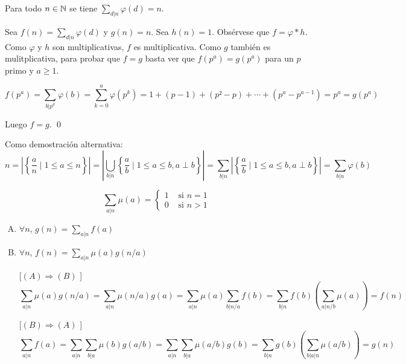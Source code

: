 \documentclass[TAN.tex]{subfiles}
\begin{document}
\begin{prop}
Para todo $n \in \mathbb{N}$ se tiene $\displaystyle\sum_{d|n} φ(d) = n$.
\end{prop}

\begin{dem}
Sea $f(n) = \sum_{d|n} φ(d)$ y $g(n) = n$. Sea $h(n) = 1$. Obsérvese que $f = φ * h$. Como $φ$ y $h$ son multiplicativas, $f$ es multiplicativa. Como $g$ también es mulitplicativa, para probar que $f = g$ basta ver que $f(p^a)=g(p^a)$ para un $p$ primo y $a ≥ 1$.

\[ f(p^a) = \sum_{b|p^a} φ(b) = \sum_{k=0}^a φ(p^k) = 1+(p-1)+(p²-p)+\cdots+(p^a-p^{a-1}) = p^a = g(p^a) \]

Luego $f = g$.
\qed

Como demostración alternativa:
\[ n = \left|\left\{\frac{a}{n} \mid 1 ≤ a ≤ n\right\}\right|
= \left|\bigcup_{b|n} \left\{\frac{a}{b} \mid 1≤a≤b, a \perp b\right\}\right|
= \sum_{b|n} \left|\left\{\frac{a}{b} \mid 1 ≤ a ≤ b, a \perp b\right\}\right|
= \sum_{b|n} φ(b) \]\QED
\end{dem}


\begin{prop}
\[ \sum_{a|n} μ(a) = \begin{cases}
	1 & \text{ si } n = 1\\
	0 & \text{ si } n > 1
\end{cases}\]
\end{prop}

\begin{prop}
\begin{enumerate}[(A)]
	\item $\forall n$, $g(n) = \sum_{a|n} f(a)$
	\item $\forall n$, $f(n) = \sum_{a|n}μ(a) g(n/a)$
\end{enumerate}

\end{prop}
\begin{dem}\mbox{}
\begin{itemize}
	\item[[$(A) \Rightarrow (B)$]]
	\[
	\sum_{a|n} μ(a)g(n/a) = \sum_{a|n}μ(n/a)g(a) = \sum_{a|n}μ(a) \sum_{b|n/a} f(b) = \sum_{b|n}f(b)\left(\sum_{a|n/b} μ(a)\right) = f(n)
	\]
	\item[[$(B) \Rightarrow (A)$]]
	\[
	\sum_{a|n}f(a) = \sum_{a|n} \sum_{b|a} μ(b)g(a/b) = \sum_{a|n}\sum_{b|a} μ(a/b)g(b) = \sum_{b|n}g(b)\left(\sum_{b|a|n}μ(a/b)\right) = g(n)
	\]
\end{itemize}
\end{dem}
\end{document}
